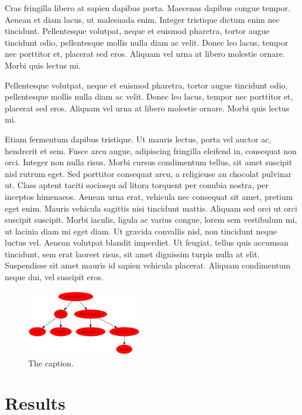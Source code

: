 \documentclass[final,12pt]{article}
\begin{document}
Cras fringilla libero at sapien dapibus
porta. Maecenas dapibus congue tempor. Aenean et diam lacus, ut
malesuada enim. Integer tristique dictum enim nec
tincidunt. Pellentesque volutpat, neque et euismod pharetra, tortor
augue tincidunt odio, pellentesque mollis nulla diam ac velit. Donec
leo lacus, tempor nec porttitor et, placerat sed eros. Aliquam vel
urna at libero molestie ornare. Morbi quis lectus mi.

Pellentesque volutpat, neque et euismod pharetra, tortor
augue tincidunt odio, pellentesque mollis nulla diam ac velit. Donec
leo lacus, tempor nec porttitor et, placerat sed eros. Aliquam vel
urna at libero molestie ornare. Morbi quis lectus mi.

Etiam fermentum dapibus tristique. Ut mauris lectus, porta vel auctor
ac, hendrerit et sem. Fusce arcu augue, adipiscing fringilla eleifend
in, consequat non orci. Integer non nulla risus. Morbi cursus
condimentum tellus, sit amet suscipit nisl rutrum eget. Sed porttitor
consequat arcu, a religieuse au chocolat pulvinar ut. Class aptent taciti
sociosqu ad litora torquent per conubia nostra, per inceptos
himenaeos. Aenean urna erat, vehicula nec consequat sit amet, pretium
eget enim. Mauris vehicula sagittis nisi tincidunt mattis. Aliquam sed
orci ut orci suscipit suscipit. Morbi iaculis, ligula ac varius
congue, lorem sem vestibulum mi, ut lacinia diam mi eget diam. Ut
gravida convallis nisl, non tincidunt neque luctus vel. Aenean
volutpat blandit imperdiet. Ut feugiat, tellus quis accumsan
tincidunt, sem erat laoreet risus, sit amet dignissim turpis nulla at
elit. Suspendisse sit amet mauris id sapien vehicula placerat. Aliquam
condimentum neque dui, vel suscipit eros.

\begin{figure}[h]
\begin{center}
\includegraphics[width=0.45\textwidth]{figures/dirtree.pdf}
\caption{The caption.}\label{fig:spectrum}       %
\end{center}
\end{figure}


\section{Results}
\end{document}
